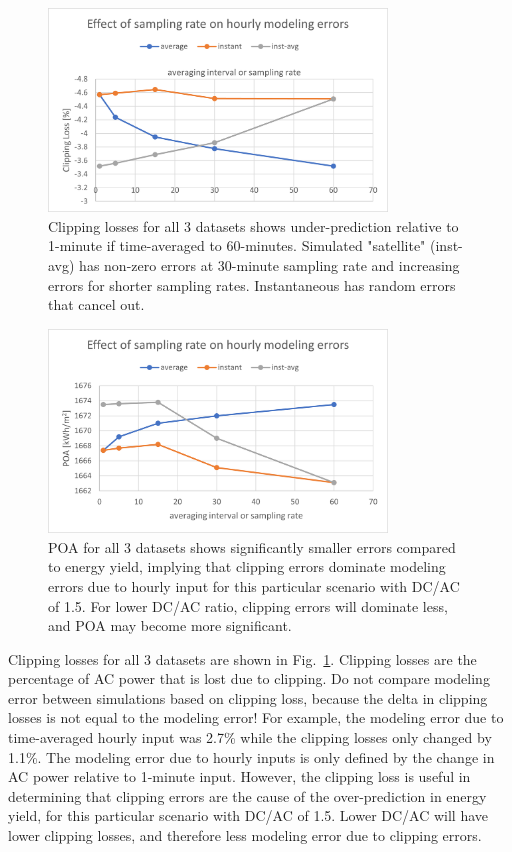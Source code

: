 \documentclass[conference]{IEEEtran}
\begin{document}
\begin{figure}[htbp]
\centerline{\includegraphics[width=9cm]{NIST_clipping_loss.png}}
\caption{Clipping losses for all 3 datasets shows under-prediction relative to 1-minute if time-averaged to 60-minutes. Simulated "satellite" (inst-avg) has non-zero errors at 30-minute sampling rate and increasing errors for shorter sampling rates. Instantaneous has random errors that cancel out.}
\label{fig:NIST-clipping-loss}
\end{figure}

\begin{figure}[htbp]
\centerline{\includegraphics[width=9cm]{NIST_POA.png}}
\caption{POA for all 3 datasets shows significantly smaller errors compared to energy yield, implying that clipping errors dominate modeling errors due to hourly input for this particular scenario with DC/AC of 1.5. For lower DC/AC ratio, clipping errors will dominate less, and POA may become more significant.}
\label{fig:NIST-POA}
\end{figure}

Clipping losses for all 3 datasets are shown in Fig.~\ref{fig:NIST-clipping-loss}. Clipping losses are the percentage of AC power that is lost due to clipping. Do not compare modeling error between simulations based on clipping loss, because the delta in clipping losses is not equal to the modeling error! For example, the modeling error due to time-averaged hourly input was 2.7\% while the clipping losses only changed by 1.1\%. The modeling error due to hourly inputs is only defined by the change in AC power relative to 1-minute input. However, the clipping loss is useful in determining that clipping errors are the cause of the over-prediction in energy yield, for this particular scenario with DC/AC of 1.5. Lower DC/AC will have lower clipping losses, and therefore less modeling error due to clipping errors.
\end{document}
